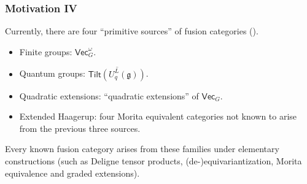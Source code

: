 \documentclass{beamer}
\newcommand{\textcat}[1]{\mathrm{\textsf{#1}}}
\begin{document}
\begin{frame}
\frametitle{Motivation IV}
Currently, there are four ``primitive sources'' of fusion categories (\cite{EIP24}).\\[1.5ex]
\begin{itemize}
\item \textcolor{structure}{Finite groups}: $\textcat{Vec}_G^\omega$.%
\item \textcolor{structure}{Quantum groups}: %
$\overline{\textcat{Tilt}(U_q^L(\mathfrak{g}))}$.%
\item \textcolor{structure}{Quadratic extensions}: ``quadratic extensions'' of $\textcat{Vec}_G$.%
\item \textcolor{structure}{Extended Haagerup}: four Morita equivalent categories not known to arise from the previous three sources.\\[2ex]
\end{itemize}
Every \textcolor{structure}{known} fusion category arises from these families under elementary constructions (such as Deligne tensor products, (de-)equivariantization, Morita equivalence and graded extensions).
\end{frame}




\end{document}
